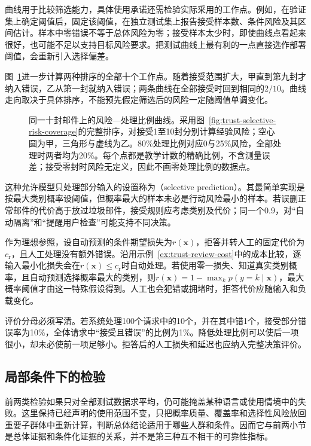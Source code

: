 曲线用于比较筛选能力，具体使用承诺还需检验实际采用的工作点。例如，在验证集上确定阈值后，固定该阈值，在独立测试集上报告接受样本数、条件风险及其区间估计。样本中零错误不等于总体风险为零；接受样本太少时，即使曲线点看起来很好，也可能不足以支持目标风险要求。把测试曲线上最有利的一点直接选作部署阈值，会重新引入选择偏差。

图~\ref{fig:trust-risk-coverage-curve}进一步计算两种排序的全部十个工作点。随着接受范围扩大，甲直到第九封才纳入错误，乙从第一封就纳入错误；两条曲线在全部接受时回到相同的$2/10$。曲线走向取决于具体排序，不能预先假定筛选后的风险一定随阈值单调变化。

\begin{figure}[!htb]
  \centering
  
  \caption{同一十封邮件上的风险—处理比例曲线。采用图~\ref{fig:trust-selective-risk-coverage}的完整排序，对接受1至10封分别计算经验风险；空心圆为甲，三角形与虚线为乙。80\%处理比例对应0与25\%风险，全部处理时两者均为20\%。每个点都是教学计数的精确比例，不含测量误差；接受零封时风险无定义，因此不画零处理比例的数据点。}
  \label{fig:trust-risk-coverage-curve}
\end{figure}

这种允许模型只处理部分输入的设置称为（selective prediction）。其最简单实现是按最大类别概率设阈值，但概率最大的样本未必是行动风险最小的样本。若误删正常邮件的代价高于放过垃圾邮件，接受规则应考虑类别及代价；同一个0.9，对“自动隔离”和“提醒用户检查”可能支持不同决策。

作为理想参照，设自动预测的条件期望损失为$r(\bm{x})$，拒答并转人工的固定代价为$c_{\mathrm r}$，且人工处理没有额外错误。沿用示例~\ref{ex:trust-review-cost}中的成本比较，逐输入最小化损失会在$r(\bm{x})\leq c_{\mathrm r}$时自动处理。若使用零一损失、知道真实类别概率，且自动预测选择概率最大的类别，则$r(\bm{x})=1-\max_k p(y=k\mid\bm{x})$，最大概率阈值才由这一特殊假设得到。人工也会犯错或拥堵时，拒答代价应随输入和负载变化。

评价分母必须写清。若系统处理100个请求中的10个，并在其中错1个，接受部分错误率为10\%，全体请求中“接受且错误”的比例为1\%。降低处理比例可以使后一项很小，却未必使前一项足够小。拒答后的人工损失和延迟也应纳入完整决策评价。

\subsection{局部条件下的检验}
\label{sec:reliability-conditional-evaluation}

前两类检验如果只对全部测试数据求平均，仍可能掩盖某种语言或使用情境中的失败。这里保持已经声明的使用范围不变，只把概率质量、覆盖率和选择性风险放回重要子群体中重新计算，判断总体结论适用于哪些人群和条件。因而它与前两小节是总体证据和条件化证据的关系，并不是第三种互不相干的可靠性指标。

